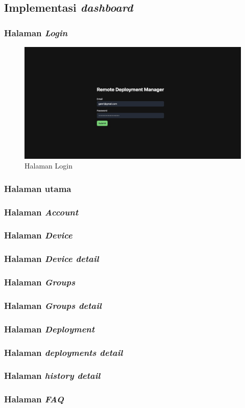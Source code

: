 \subsection{Implementasi \textit{dashboard}}


\subsubsection{Halaman \textit{Login}}

\begin{figure}[ht]
  \centering
  \includegraphics[width=1\textwidth]{resources/chapter-4/dashboard/login-page.jpg}
  \caption{Halaman Login}
  \label{fig:halaman-login}
\end{figure}

\subsubsection{Halaman utama}

\subsubsection{Halaman \textit{Account}}
\subsubsection{Halaman \textit{Device}}
\subsubsection{Halaman \textit{Device detail}}
\subsubsection{Halaman \textit{Groups}}
\subsubsection{Halaman \textit{Groups detail}}
\subsubsection{Halaman \textit{Deployment}}
\subsubsection{Halaman \textit{deployments detail}}
\subsubsection{Halaman \textit{history detail}}
\subsubsection{Halaman \textit{FAQ}}